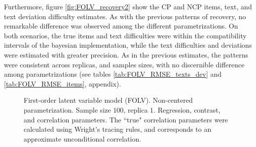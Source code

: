 Furthermore, figure \ref{fig:FOLV_recovery2} show the CP and NCP items, text, and text deviation difficulty estimates. As with the previous patterns of recovery, no remarkable difference was observed among the different parametrizations. On both scenarios, the true items and text difficulties were within the compatibility intervals of the bayesian implementation, while the text difficulties and deviations were estimated with greater precision. As in the previous estimates, the patterns were consistent across replicas, and samples sizes, with no discernible difference among parametrizations (see tables \ref{tab:FOLV_RMSE_texts_dev} and \ref{tab:FOLV_RMSE_items}, appendix).
%
\begin{figure}[H]
	\centering
	\begin{subfigure}
		\texttt{[image: FOLV\_NC\_J100\_Ndata1\_regression]}
	\end{subfigure}
	\begin{subfigure}
		\texttt{[image: FOLV\_NC\_J100\_Ndata1\_corr]}
	\end{subfigure}
	\caption[First-order latent variable model (FOLV). Non-centered parametrization. Sample size $100$, replica $1$. Regression, contrast, and correlation parameters.]%
	{First-order latent variable model (FOLV). Non-centered parametrization. Sample size $100$, replica $1$. Regression, contrast, and correlation parameters. The ``true" correlation parameters were calculated using Wright's tracing rules, and corresponds to an approximate unconditional correlation.}
	\label{fig:FOLV_NC_recovery1}
\end{figure}

